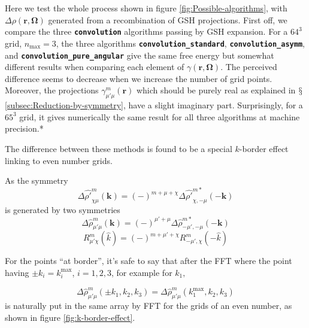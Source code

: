 Here we test the whole process shown in figure \ref{fig:Possible-algorithms},
with $\Delta\rho(\mathbf{r},\mathbf{\Omega})$ generated from a recombination
of \acs{GSH} projections. First off, we compare the three \texttt{\textbf{convolution}}
algorithms passing by \acs{GSH} expansion. For a $64^{3}$ grid,
$n_{\max}=3$, the three algorithms \texttt{\textbf{convolution\_standard}},
\texttt{\textbf{convolution\_asymm}}, and \texttt{\textbf{convolution\_pure\_angular}}
give the same free energy but somewhat different results when comparing
each element of $\gamma(\mathbf{r},\mathbf{\Omega})$. The perceived difference
seems to decrease when we increase the number of grid points. Moreover, the
projections $\gamma_{\mu'\mu}^{m}(\mathbf{r})$ which should be purely
real as explained in $\mathsection$\ref{subsec:Reduction-by-symmetry},
have a slight imaginary part. Surprisingly, for a $65^{3}$ grid,
it gives numerically the same result for all three algorithms
at machine precision.{*} 

The difference between these methods is found to be a special $k$-border
effect linking to even number grids.

As the symmetry
\begin{equation}
\Delta\hat{\rho'}_{\chi\mu}^{m}(\mathbf{k})=(-)^{m+\mu+\chi}\Delta\hat{\rho'}_{\chi,-\mu}^{m*}(-\mathbf{k})\label{eq:2-1}
\end{equation}
 is generated by two symmetries
\begin{equation}
\Delta\hat{\rho}_{\mu'\mu}^{m}(\mathbf{k})=(-)^{\mu'+\mu}\Delta\hat{\rho}_{-\mu',-\mu}^{m*}(-\mathbf{k})\label{eq:1-1}
\end{equation}
\begin{equation}
R_{\mu'\chi}^{m}(\hat{k})=(-)^{m+\mu'+\chi}R_{-\mu',\chi}^{m}(-\hat{k})\label{eq:3-1}
\end{equation}

For the points ``at border'', it's safe to say that after the FFT where %
the point having $\pm k_{i}=k_{i}^{\mathrm{max}}$, $i=1,2,3$, for
example for $k_{1},$

\[
\Delta\hat{\rho}_{\mu'\mu}^{m}(\pm k_{1},k_{2},k_{3})=\Delta\hat{\rho}_{\mu'\mu}^{m}(k_{1}^{\mathrm{max}},k_{2},k_{3})
\]
is naturally put in the same array by FFT for the grids of an even
number, as shown in figure \ref{fig:k-border-effect}. 

